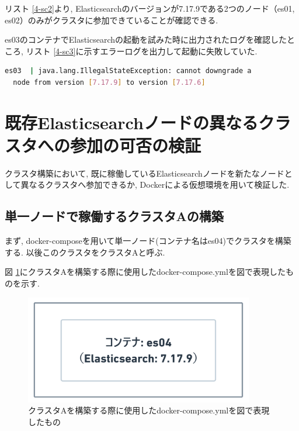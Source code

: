 リスト \ref{4-sc2}より, Elasticsearchのバージョンが7.17.9である2つのノード（es01, es02）のみがクラスタに参加できていることが確認できる.

es03のコンテナでElasticsearchの起動を試みた時に出力されたログを確認したところ, リスト \ref{4-sc3}に示すエラーログを出力して起動に失敗していた.

\begin{lstlisting}[language=bash, caption=es03のログ, label=4-sc3]
  es03  | java.lang.IllegalStateException: cannot downgrade a
  node from version [7.17.9] to version [7.17.6]
\end{lstlisting}

\section{既存Elasticsearchノードの異なるクラスタへの参加の可否の検証}
クラスタ構築において, 既に稼働しているElasticsearchノードを新たなノードとして異なるクラスタへ参加できるか, Dockerによる仮想環境を用いて検証した.

\subsection{単一ノードで稼働するクラスタAの構築}

まず, docker-composeを用いて単一ノード(コンテナ名はes04)でクラスタを構築する. 以後このクラスタをクラスタAと呼ぶ.

図 \ref{4-p8}にクラスタAを構築する際に使用したdocker-compose.ymlを図で表現したものを示す.

\begin{figure}[H]
  \begin{center}
    \includegraphics[width=100mm]{sotu/figure/1-7.17.9.png}
    \caption{クラスタAを構築する際に使用したdocker-compose.ymlを図で表現したもの}
    \label{4-p8}
  \end{center}
\end{figure}


